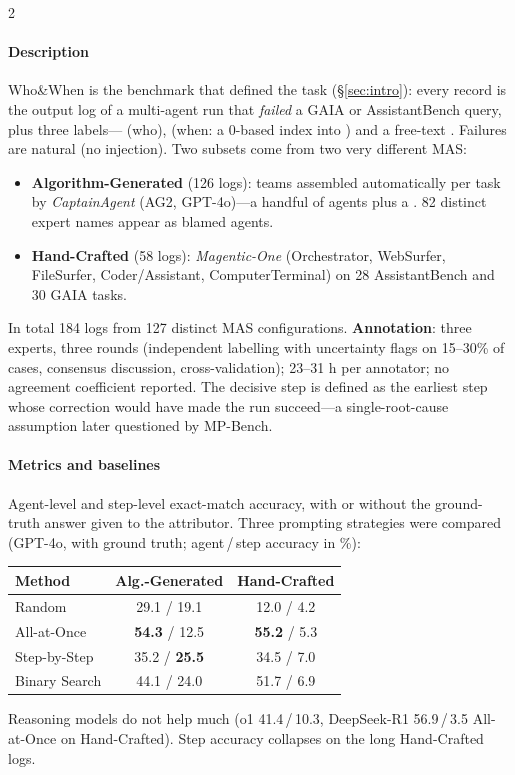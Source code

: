 \begin{multicols}{2}
\paragraph{Description} Who\&When is the benchmark that defined the task (\S\ref{sec:intro}): every record is the output log of a multi-agent run that \emph{failed} a GAIA or AssistantBench query, plus three labels--- (who),  (when: a 0-based index into ) and a free-text . Failures are natural (no injection). Two subsets come from two very different MAS:
\begin{itemize}
\item \textbf{Algorithm-Generated} (126 logs): teams assembled automatically per task by \emph{CaptainAgent} (AG2, GPT-4o)---a handful of  agents plus a . 82 distinct expert names appear as blamed agents.
\item \textbf{Hand-Crafted} (58 logs): \emph{Magentic-One} (Orchestrator, WebSurfer, FileSurfer, Coder/Assistant, ComputerTerminal) on 28 AssistantBench and 30 GAIA tasks.
\end{itemize}
In total 184 logs from 127 distinct MAS configurations. \textbf{Annotation}: three experts, three rounds (independent labelling with uncertainty flags on 15--30\% of cases, consensus discussion, cross-validation); 23--31 h per annotator; no agreement coefficient reported. The decisive step is defined as the earliest step whose correction would have made the run succeed---a single-root-cause assumption later questioned by MP-Bench.

\paragraph{Metrics and baselines} Agent-level and step-level exact-match accuracy, with or without the ground-truth answer given to the attributor. Three prompting strategies were compared (GPT-4o, with ground truth; agent\,/\,step accuracy in \%):

\begin{center}\small
\begin{tabular}{@{}lcc@{}}\toprule
Method & Alg.-Generated & Hand-Crafted\\\midrule
Random & 29.1 / 19.1 & 12.0 / 4.2\\
All-at-Once & \textbf{54.3} / 12.5 & \textbf{55.2} / 5.3\\
Step-by-Step & 35.2 / \textbf{25.5} & 34.5 / 7.0\\
Binary Search & 44.1 / 24.0 & 51.7 / 6.9\\\bottomrule
\end{tabular}
\end{center}
Reasoning models do not help much (o1 41.4\,/\,10.3, DeepSeek-R1 56.9\,/\,3.5 All-at-Once on Hand-Crafted). Step accuracy collapses on the long Hand-Crafted logs.


\end{multicols}
